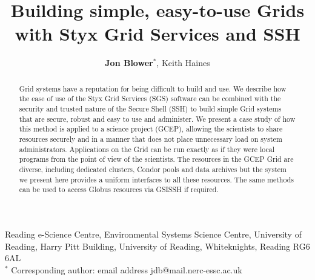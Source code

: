\documentclass[a4paper]{article}
\begin{document}
\title{Building simple, easy-to-use Grids with Styx Grid Services and SSH}

\author{\textbf{Jon Blower$^{*}$}, Keith Haines}
\date{}

\maketitle

\begin{center}
Reading e-Science Centre, Environmental Systems Science Centre, University of Reading, Harry Pitt Building, University of Reading, Whiteknights, Reading RG6 6AL \\
\medskip
$^{*}$ Corresponding author: email address jdb@mail.nerc-essc.ac.uk
\end{center}

\bigskip

\begin{abstract}
Grid systems have a reputation for being difficult to build and use.  We describe how the ease of use of the Styx Grid Services (SGS) software can be combined with the security and trusted nature of the Secure Shell (SSH) to build simple Grid systems that are secure, robust and easy to use and administer.  We present a case study of how this method is applied to a science project (GCEP), allowing the scientists to share resources securely and in a manner that does not place unnecessary load on system administrators.  Applications on the Grid can be run exactly as if they were local programs from the point of view of the scientists.  The resources in the GCEP Grid are diverse, including dedicated clusters, Condor pools and data archives but the system we present here provides a uniform interfaces to all these resources.  The same methods can be used to access Globus resources via GSISSH if required.
\end{abstract}

\bigskip
\end{document}
